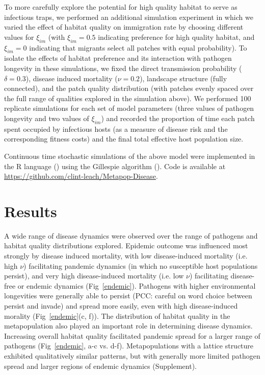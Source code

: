 \documentclass{article}
\begin{document}
To more carefully explore the potential for high quality habitat to serve as infectious traps, we performed an additional simulation experiment in which we varied the effect of habitat quality on immigration rate by choosing different values for $\xi_{im}$ (with $\xi_{im} = 0.5$ indicating preference for high quality habitat, and  $\xi_{im} = 0$ indicating that migrants select all patches with equal probability).  To isolate the effects of habitat preference and its interaction with pathogen longevity in these simulations, we fixed the direct transmission probability ($\delta = 0.3$), disease induced mortality ($\nu = 0.2$), landscape structure (fully connected), and the patch quality distribution (with patches evenly spaced over the full range of qualities explored in the simulation above).  We performed 100 replicate simulations for each set of model parameters (three values of pathogen longevity and two values of $\xi_{im}$) and recorded the proportion of time each patch spent occupied by infectious hosts (as a measure of disease risk and the corresponding fitness costs) and the final total effective host population size.

Continuous time stochastic simulations of the above model were implemented in the R language (\cite{R2014}) using the Gillespie algorithm (\cite{Gillespie1977}).  Code is available at \url{https://github.com/clint-leach/Metapop-Disease}.

\section{Results}
\label{results}

A wide range of disease dynamics were observed over the range of pathogens and habitat quality distributions explored.  
Epidemic outcome was influenced most strongly by disease induced mortality, with low disease-induced mortality (i.e. high $\nu$) facilitating pandemic dynamics (in which no susceptible host populations persist), and very high disease-induced mortality (i.e. low $\nu$) facilitating disease-free or endemic dynamics (Fig~\ref{endemic}). 
Pathogens with higher environmental longevities were generally able to persist (PCC: careful on word choice between persist and invade) and spread more easily, even with high disease-induced morality (Fig~\ref{endemic}(c, f)).  
The distribution of habitat quality in the metapopulation also played an important role in determining disease dynamics.  Increasing overall habitat quality facilitated pandemic spread for a larger range of pathogens (Fig~\ref{endemic}, a-c vs. d-f).
Metapopulations with a lattice structure exhibited qualitatively similar patterns, but with generally more limited pathogen spread and larger regions of endemic dynamics (Supplement).
\end{document}
